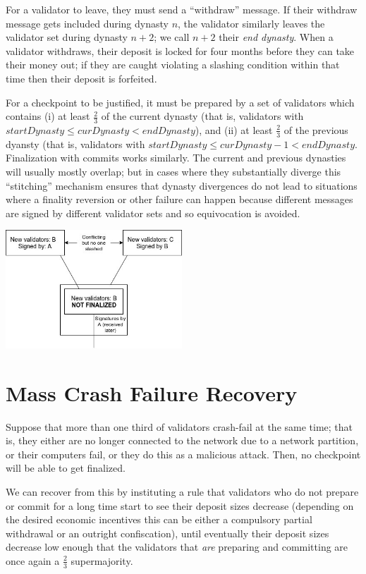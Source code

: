 \documentclass[12pt]{article}
\begin{document}
For a validator to leave, they must send a ``withdraw'' message. If their withdraw message gets included during dynasty $n$, the validator similarly leaves the validator set during dynasty $n+2$; we call $n+2$ their \textit{end dynasty}. When a validator withdraws, their deposit is locked for four months before they can take their money out; if they are caught violating a slashing condition within that time then their deposit is forfeited.

For a checkpoint to be justified, it must be prepared by a set of validators which contains (i) at least $\frac{2}{3}$ of the current dynasty (that is, validators with $startDynasty \le curDynasty < endDynasty$), and (ii) at least $\frac{2}{3}$ of the previous dyansty (that is, validators with $startDynasty \le curDynasty - 1 < endDynasty$. Finalization with commits works similarly. The current and previous dynasties will usually mostly overlap; but in cases where they substantially diverge this ``stitching'' mechanism ensures that dynasty divergences do not lead to situations where a finality reversion or other failure can happen because different messages are signed by different validator sets and so equivocation is avoided.

\includegraphics[width=250px]{validator_set_misalignment.png}

\section{Mass Crash Failure Recovery}

Suppose that more than one third of validators crash-fail at the same time; that is, they either are no longer connected to the network due to a network partition, or their computers fail, or they do this as a malicious attack. Then, no checkpoint will be able to get finalized.

We can recover from this by instituting a rule that validators who do not prepare or commit for a long time start to see their deposit sizes decrease (depending on the desired economic incentives this can be either a compulsory partial withdrawal or an outright confiscation), until eventually their deposit sizes decrease low enough that the validators that \textit{are} preparing and committing are once again a $\frac{2}{3}$ supermajority.
\end{document}
